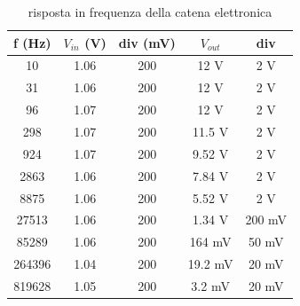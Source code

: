\documentclass{article}
\begin{document}
\begin{table}[H]
    \centering
    \begin{tabular}{ccccc}
        \toprule
        f (Hz) & $V_{in}$ (V) & div (mV) & $V_{out}$ & div\\
        \midrule
        10 & 1.06 & 200 & 12 V & 2 V\\
        31 & 1.06 & 200 & 12 V& 2 V\\
        96 & 1.07 & 200 & 12 V& 2 V\\
        298 & 1.07 & 200 & 11.5 V& 2 V\\
        924 & 1.07 & 200 & 9.52 V& 2 V\\
        2863 & 1.06 & 200 & 7.84 V& 2 V\\
        8875 & 1.06 & 200 & 5.52 V& 2 V\\
        27513 & 1.06 & 200 & 1.34 V& 200 mV\\
        85289 & 1.06 & 200 & 164 mV& 50 mV\\
        264396 & 1.04 & 200 & 19.2 mV & 20 mV\\
        819628 & 1.05 & 200 & 3.2 mV & 20 mV\\
        \bottomrule
    \end{tabular}
    \caption{risposta in frequenza della catena elettronica}
\end{table}
\end{document}
